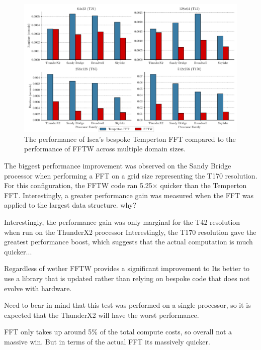 \documentclass[a4paper,11pt]{report}
\begin{document}
\begin{figure}[htbp]
    \centering
    \includegraphics[width=1\textwidth]{img/compare_fft.pdf}
    \caption[Performance comparison of FFTW and Temperton's FFT]{The performance of Isca's bespoke Temperton FFT compared to the performance of FFTW across multiple domain sizes.  }
    \label{fig:fft-times}
\end{figure}
\par
The biggest performance improvement was observed on the Sandy Bridge processor when performing a FFT on a grid size representing the T170 resolution. For this configuration, the FFTW code ran 5.25$\times$ quicker than the Temperton FFT. Interestingly, a greater performance gain was measured when the FFT was applied to the largest data structure. why?
\par
Interestingly, the performance gain was only marginal for the T42 resolution when run on the ThunderX2 processor Interestingly, the T170 resolution gave the greatest performance boost, which suggests that the actual computation is much quicker... 
\par
Regardless of wether FFTW provides a significant improvement to Its better to use a library that is updated rather than relying on bespoke code that does not evolve with hardware. 
\par
Need to bear in mind that this test was performed on a single processor, so it is expected that the ThunderX2 will have the worst performance. 
\par
FFT only takes up around 5\% of the total compute costs, so overall not a massive win. But in terms of the actual FFT its massively quicker.
\end{document}
